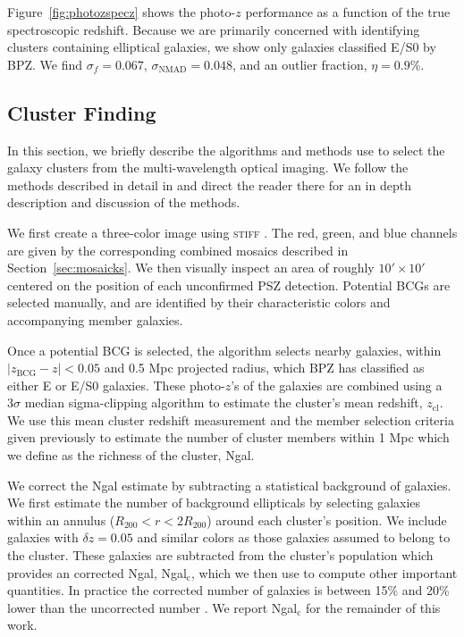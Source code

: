 \documentclass[apj, revtex4-1]{emulateapj}
\begin{document}
Figure~\ref{fig:photozspecz} shows the photo-$z$ performance as a function of the true spectroscopic redshift. Because we are primarily concerned with identifying clusters containing elliptical galaxies, we show only galaxies classified E/S0 by BPZ. We find $\sigma_f = 0.067$, $\sigma_\mathrm{NMAD} = 0.048$, and an outlier fraction, $\eta = 0.9\%$.

\subsection{Cluster Finding}
In this section, we briefly describe the algorithms and methods use to select the galaxy clusters from the multi-wavelength optical imaging. We follow the methods described in detail in \cite{Menanteau2009a, Menanteau2010} and direct the reader there for an in depth description and discussion of the methods.

We first create a three-color image using \textsc{stiff} \citep{Bertin2011}. The red, green, and blue channels are given by the corresponding combined mosaics described in Section~\ref{sec:mosaicks}. We then visually inspect an area of roughly $10' \times 10'$ centered on the position of each unconfirmed PSZ detection. Potential BCGs are selected manually, and are identified by their characteristic colors and accompanying member galaxies.


Once a potential BCG is selected, the algorithm selects nearby galaxies, within $|z_\mathrm{BCG} - z| < 0.05$ and 0.5 Mpc projected radius, which BPZ has classified as either E or E/S0 galaxies. These photo-$z$'s of the galaxies are combined using a $3\sigma$ median sigma-clipping algorithm to estimate the cluster's mean redshift, $z_\mathrm{cl}$. We use this mean cluster redshift measurement and the member selection criteria given previously to estimate the number of cluster members within 1 Mpc which we define as the richness  of the cluster, Ngal.

We correct the Ngal estimate by subtracting a statistical background of galaxies. We first estimate the number of background ellipticals by selecting galaxies within an annulus ($R_{200} <r < 2R_{200}$) around each cluster's position. We include galaxies with $\delta z = 0.05$ and similar colors as those galaxies assumed to belong to the cluster. These galaxies are subtracted from the cluster's population which provides an corrected Ngal, Ngal$_\mathrm{c}$, which we then use to compute other important quantities. In practice the corrected number of galaxies is between 15\% and 20\% lower than the uncorrected number \citep{Menanteau2010}. We report Ngal$_\mathrm{c}$ for the remainder of this work.
\end{document}
